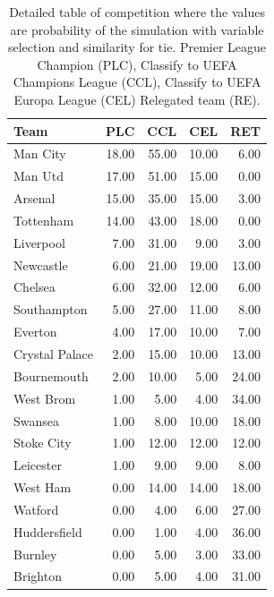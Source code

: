 \documentclass[review]{elsarticle}
\begin{document}
\begin{table}[!h]
\centering
\scriptsize
\begin{scriptsize}
\begin{tabular}{lrrrr}
  \hline
Team & PLC & CCL & CEL & RET \\ 
  \hline
Man City & 18.00 & 55.00 & 10.00 & 6.00 \\ 
  Man Utd & 17.00 & 51.00 & 15.00 & 0.00 \\ 
  Arsenal & 15.00 & 35.00 & 15.00 & 3.00 \\ 
  Tottenham & 14.00 & 43.00 & 18.00 & 0.00 \\ 
  Liverpool & 7.00 & 31.00 & 9.00 & 3.00 \\ 
  Newcastle & 6.00 & 21.00 & 19.00 & 13.00 \\ 
  Chelsea & 6.00 & 32.00 & 12.00 & 6.00 \\ 
  Southampton & 5.00 & 27.00 & 11.00 & 8.00 \\ 
  Everton & 4.00 & 17.00 & 10.00 & 7.00 \\ 
  Crystal Palace & 2.00 & 15.00 & 10.00 & 13.00 \\ 
  Bournemouth & 2.00 & 10.00 & 5.00 & 24.00 \\ 
  West Brom & 1.00 & 5.00 & 4.00 & 34.00 \\ 
  Swansea & 1.00 & 8.00 & 10.00 & 18.00 \\ 
  Stoke City & 1.00 & 12.00 & 12.00 & 12.00 \\ 
  Leicester & 1.00 & 9.00 & 9.00 & 8.00 \\ 
  West Ham & 0.00 & 14.00 & 14.00 & 18.00 \\ 
  Watford & 0.00 & 4.00 & 6.00 & 27.00 \\ 
  Huddersfield & 0.00 & 1.00 & 4.00 & 36.00 \\ 
  Burnley & 0.00 & 5.00 & 3.00 & 33.00 \\ 
  Brighton & 0.00 & 5.00 & 4.00 & 31.00 \\ 
   \hline
\end{tabular}
\end{scriptsize}
    \caption[\scriptsize{TAVB} with selection and similarity]{\scriptsize{Detailed table of competition where the values are probability of the simulation with variable selection and similarity for tie. Premier League Champion (PLC), Classify to UEFA Champions League (CCL), Classify to UEFA Europa League (CEL) Relegated team (RE).}}
    \label{tab:forecastsiselec}
\end{table}
\end{document}
